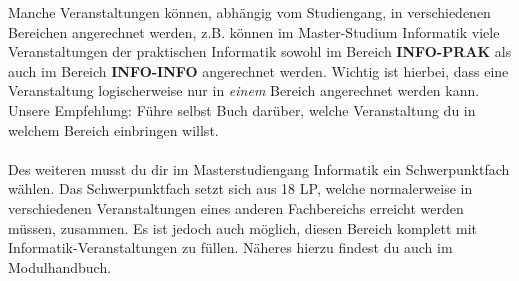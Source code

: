 \fi

\ifinfo
Manche Veranstaltungen können, abhängig vom Studiengang, in verschiedenen Bereichen angerechnet werden, z.B. können im Master-Studium Informatik viele Veranstaltungen der praktischen Informatik sowohl im Bereich \textbf{INFO-PRAK} als auch im Bereich \textbf{INFO-INFO} angerechnet werden. Wichtig ist hierbei, dass eine Veranstaltung logischerweise nur in \emph{einem} Bereich angerechnet werden kann. Unsere Empfehlung: Führe selbst Buch darüber, welche Veranstaltung du in welchem Bereich einbringen willst. \\\\
Des weiteren musst du dir im Masterstudiengang Informatik ein Schwerpunktfach wählen. Das Schwerpunktfach setzt sich aus 18 LP, welche normalerweise in verschiedenen Veranstaltungen eines anderen Fachbereichs erreicht werden müssen, zusammen. Es ist jedoch auch möglich, diesen Bereich komplett mit Informatik-Veranstaltungen zu füllen. Näheres hierzu findest du auch im Modulhandbuch. 

\fi\ 
